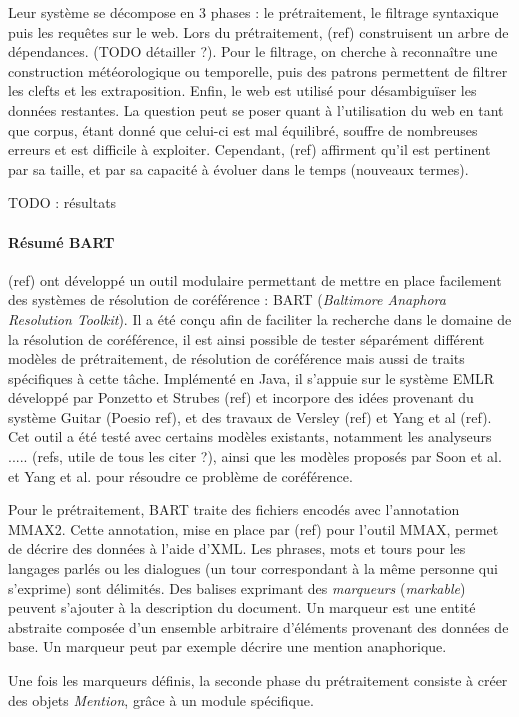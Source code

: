 \documentclass[a4paper,12pt]{article}
\begin{document}
Leur système se décompose en 3 phases : le prétraitement, le filtrage syntaxique puis les requêtes sur le web.
Lors du prétraitement, (ref) construisent un arbre de dépendances. (TODO détailler ?). Pour le filtrage, on cherche à reconnaître une construction météorologique ou temporelle, puis des patrons permettent de filtrer les clefts et les extraposition.
Enfin, le web est utilisé pour désambiguïser les données restantes. La question peut se poser quant à l'utilisation du web en tant que corpus, étant donné que celui-ci est mal équilibré, souffre de nombreuses erreurs et est difficile à exploiter. Cependant, (ref) affirment qu'il est pertinent par sa taille, et par sa capacité à évoluer dans le temps (nouveaux termes).

TODO : résultats

\paragraph{Résumé BART}
(ref) ont développé un outil modulaire permettant de mettre en place facilement des systèmes de résolution de coréférence : BART (\textit{Baltimore Anaphora Resolution Toolkit}).
Il a été conçu afin de faciliter la recherche dans le domaine de la résolution de coréférence, il est ainsi possible de tester séparément différent modèles de prétraitement, de résolution de coréférence mais aussi de traits spécifiques à cette tâche.
Implémenté en Java, il s'appuie sur le système EMLR développé par Ponzetto et Strubes (ref) et incorpore des idées provenant du système Guitar (Poesio ref), et des travaux de Versley (ref) et Yang et al (ref).
Cet outil a été testé avec certains modèles existants, notamment les analyseurs ..... (refs, utile de tous les citer ?), ainsi que les modèles proposés par Soon et al. et Yang et al. pour résoudre ce problème de coréférence.

Pour le prétraitement, BART traite des fichiers encodés avec l'annotation MMAX2. Cette annotation, mise en place par (ref) pour l'outil MMAX, permet de décrire des données à l'aide d'XML. Les phrases, mots et tours pour les langages parlés ou les dialogues (un tour correspondant à la même personne qui s'exprime) sont délimités. Des balises exprimant des \textit{marqueurs} (\textit{markable}) peuvent s'ajouter à la description du document. Un marqueur est une entité abstraite composée d'un ensemble arbitraire d'éléments provenant des données de base. Un marqueur peut par exemple décrire une mention anaphorique.

Une fois les marqueurs définis, la seconde phase du prétraitement consiste à créer des objets \textit{Mention}, grâce à un module spécifique.
\end{document}
